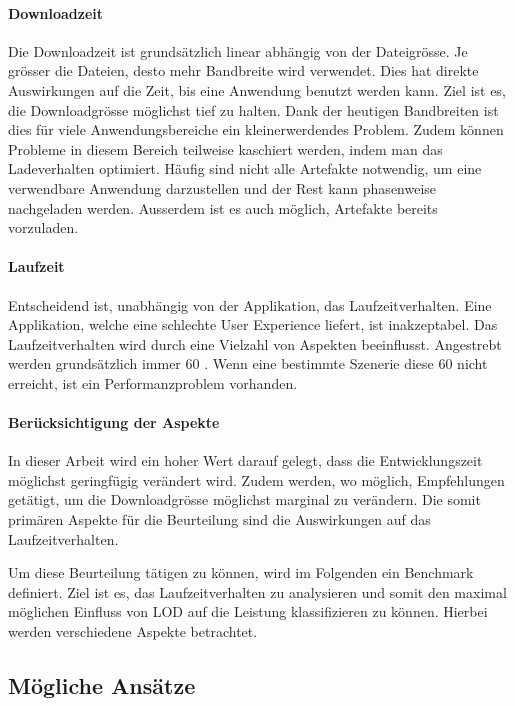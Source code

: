 \paragraph{Downloadzeit}

Die Downloadzeit ist grundsätzlich linear abhängig von der Dateigrösse.
Je grösser die Dateien, desto mehr Bandbreite wird verwendet. Dies hat direkte Auswirkungen auf die Zeit, bis eine Anwendung benutzt werden kann. Ziel ist es, die Downloadgrösse möglichst tief zu halten.
Dank der heutigen Bandbreiten ist dies für viele Anwendungsbereiche ein kleinerwerdendes Problem.
Zudem können Probleme in diesem Bereich teilweise kaschiert werden, indem man das Ladeverhalten optimiert. Häufig sind nicht alle Artefakte notwendig, um eine verwendbare Anwendung darzustellen und der Rest kann phasenweise nachgeladen werden.
Ausserdem ist es auch möglich, Artefakte bereits vorzuladen.

\paragraph{Laufzeit}

Entscheidend ist, unabhängig von der Applikation, das Laufzeitverhalten. Eine Applikation, welche eine schlechte User Experience liefert, ist inakzeptabel.
Das Laufzeitverhalten wird durch eine Vielzahl von Aspekten beeinflusst.
Angestrebt werden grundsätzlich immer 60 . Wenn eine bestimmte Szenerie diese 60  nicht erreicht, ist ein Performanzproblem vorhanden.

\paragraph{Berücksichtigung der Aspekte}
In dieser Arbeit wird ein hoher Wert darauf gelegt, dass die Entwicklungszeit möglichst geringfügig verändert wird. Zudem werden, wo möglich, Empfehlungen getätigt, um die Downloadgrösse möglichst marginal zu verändern.
Die somit primären Aspekte für die Beurteilung sind die Auswirkungen auf das Laufzeitverhalten.

Um diese Beurteilung tätigen zu können, wird im Folgenden ein Benchmark definiert. Ziel ist es, das Laufzeitverhalten zu analysieren und somit den maximal möglichen Einfluss von LOD auf die Leistung klassifizieren zu können. Hierbei werden verschiedene Aspekte betrachtet.

\subsection{Mögliche Ansätze}

